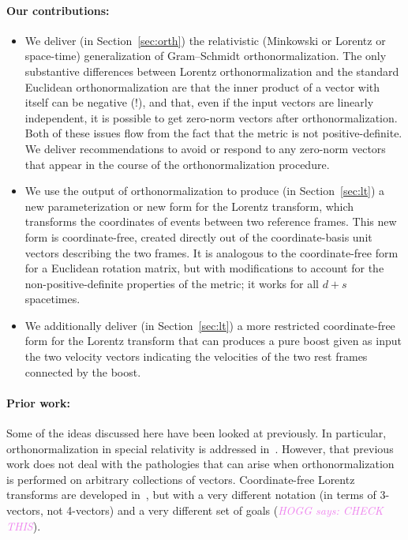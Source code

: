 \documentclass{article}
\newcommand{\plus}{\!+\!} %
\newcommand{\secref}[1]{Section~\ref{#1}}
\newcommand{\HOGG}[1]{\textcolor{violet}{\textsl{HOGG says: {#1}}}}
\begin{document}
\paragraph{Our contributions:}
\begin{itemize}
\item
We deliver (in \secref{sec:orth}) the relativistic (Minkowski or Lorentz or space-time) generalization of Gram--Schmidt orthonormalization.
The only substantive differences between Lorentz orthonormalization and the standard Euclidean orthonormalization are that the inner product of a vector with itself can be negative (!), and that, even if the input vectors are linearly independent, it is possible to get zero-norm vectors after orthonormalization.
Both of these issues flow from the fact that the metric is not positive-definite.
We deliver recommendations to avoid or respond to any zero-norm vectors that appear in the course of the orthonormalization procedure.
\item
We use the output of orthonormalization to produce (in \secref{sec:lt}) a new parameterization or new form for the Lorentz transform, which transforms the coordinates of events between two reference frames.
This new form is coordinate-free, created directly out of the coordinate-basis unit vectors describing the two frames.
It is analogous to the coordinate-free form for a Euclidean rotation matrix, but with modifications to account for the non-positive-definite properties of the metric; it works for all $d\plus s$ spacetimes.
\item
We additionally deliver (in \secref{sec:lt}) a more restricted coordinate-free form for the Lorentz transform that can produces a pure boost given as input the two velocity vectors indicating the velocities of the two rest frames connected by the boost.
\end{itemize}

\paragraph{Prior work:}
Some of the ideas discussed here have been looked at previously.
In particular, orthonormalization in special relativity is addressed in~\cite{joot}.
However, that previous work does not deal with the pathologies that can arise when orthonormalization is performed on arbitrary collections of vectors.
Coordinate-free Lorentz transforms are developed in~\cite{wagner}, but with a very different notation (in terms of 3-vectors, not 4-vectors) and a very different set of goals (\HOGG{CHECK THIS}).
\end{document}
